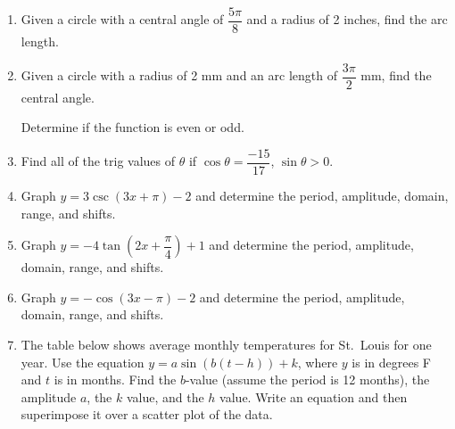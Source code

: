 \documentclass[11pt]{article}
\begin{document}
    \begin{enumerate}

        \item Given a circle with a central angle of $\dfrac{5\pi}{8}$ and a radius of 2 inches, find the arc length.

        \vspace{20ex}

        \item Given a circle with a radius of 2 mm and an arc length of $\dfrac{3\pi}{2}$ mm, find the central angle.

        \vspace{20ex}

        \noindent Determine if the function is even or odd.


        \item Find all of the trig values of $\theta$ if $\displaystyle \cos\theta = \dfrac{-15}{17}$, $\sin\theta > 0$.

        \vspace{33ex}

        \item Graph $\displaystyle y = 3\csc(3x + \pi) - 2$ and determine the period, amplitude, domain, range, and shifts.

        \emptygraph

        \newpage

        \item Graph $\displaystyle y = -4\tan\!\left(2x + \dfrac{\pi}{4}\right) + 1$ and determine the period, amplitude, domain, range, and shifts.

        \emptygraph

        \vspace{1ex}

        \item Graph $\displaystyle y = -\cos(3x - \pi) - 2$ and determine the period, amplitude, domain, range, and shifts.

        \emptygraph

        \newpage

        \item The table below shows average monthly temperatures for St.\ Louis for one year. Use the equation $\displaystyle y = a\sin(b(t-h)) + k$, where $y$ is in degrees F and $t$ is in months. Find the $b$-value (assume the period is 12 months), the amplitude $a$, the $k$ value, and the $h$ value. Write an equation and then superimpose it over a scatter plot of the data.\\[2ex]


\end{enumerate}
\end{document}
